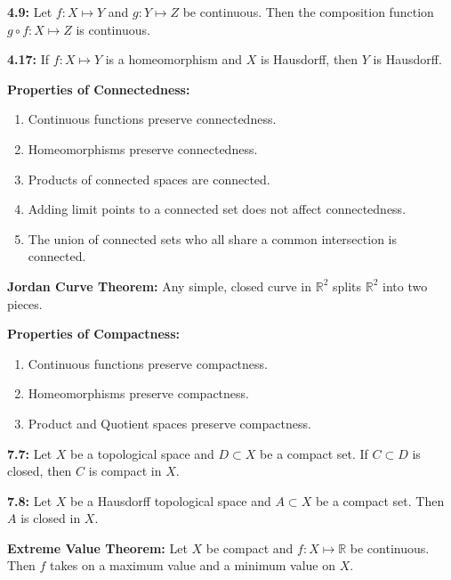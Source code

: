 \documentclass[letterpaper,12pt]{article}
\begin{document}
	\textbf{4.9:}
		Let $f:X\mapsto Y$ and $g:Y\mapsto Z$ be continuous. Then the composition function $g\circ f:X\mapsto Z$ is continuous.
	\newline{}

	\textbf{4.17:}
		If $f:X\mapsto Y$ is a homeomorphism and $X$ is Hausdorff, then $Y$ is Hausdorff.
	\newline{}

	\textbf{Properties of Connectedness:}
	\begin{enumerate}
		\item Continuous functions preserve connectedness.
		\item Homeomorphisms preserve connectedness.
		\item Products of connected spaces are connected.
		\item Adding limit points to a connected set does not affect connectedness.
		\item The union of connected sets who all share a common intersection is connected.
	\end{enumerate}

	\textbf{Jordan Curve Theorem:}
		Any simple, closed curve in $\mathbb{R}^{2}$ splits $\mathbb{R}^{2}$ into two pieces.
	\newline{}

	\textbf{Properties of Compactness:}
	\begin{enumerate}
		\item Continuous functions preserve compactness.
		\item Homeomorphisms preserve compactness.
		\item Product and Quotient spaces preserve compactness.
	\end{enumerate}

	\textbf{7.7:}
		Let $X$ be a topological space and $D\subset X$ be a compact set. If $C\subset D$ is closed, then $C$ is compact in $X$.
	\newline{}

	\textbf{7.8:}
		Let $X$ be a Hausdorff topological space and $A\subset X$ be a compact set. Then $A$ is closed in $X$.
	\newline{}

	\textbf{Extreme Value Theorem:}
		Let $X$ be compact and $f:X\mapsto\mathbb{R}$ be continuous. Then $f$ takes on a maximum value and a minimum value on $X$.
\end{document}
